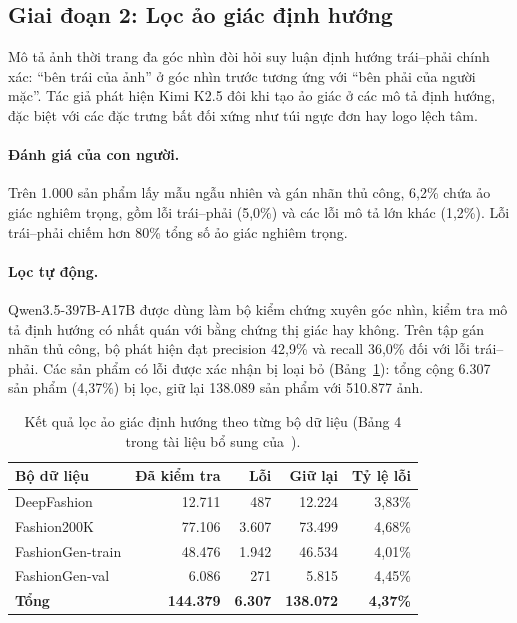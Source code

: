 \subsection{Giai đoạn 2: Lọc ảo giác định hướng}

Mô tả ảnh thời trang đa góc nhìn đòi hỏi suy luận định hướng trái--phải chính xác: ``bên trái của ảnh'' ở góc nhìn trước tương ứng với ``bên phải của người mặc''. Tác giả phát hiện Kimi K2.5 đôi khi tạo ảo giác ở các mô tả định hướng, đặc biệt với các đặc trưng bất đối xứng như túi ngực đơn hay logo lệch tâm.

\paragraph{Đánh giá của con người.} Trên 1.000 sản phẩm lấy mẫu ngẫu nhiên và gán nhãn thủ công, 6,2\% chứa ảo giác nghiêm trọng, gồm lỗi trái--phải (5,0\%) và các lỗi mô tả lớn khác (1,2\%). Lỗi trái--phải chiếm hơn 80\% tổng số ảo giác nghiêm trọng.

\paragraph{Lọc tự động.} Qwen3.5-397B-A17B được dùng làm bộ kiểm chứng xuyên góc nhìn, kiểm tra mô tả định hướng có nhất quán với bằng chứng thị giác hay không. Trên tập gán nhãn thủ công, bộ phát hiện đạt precision 42,9\% và recall 36,0\% đối với lỗi trái--phải. Các sản phẩm có lỗi được xác nhận bị loại bỏ (Bảng~\ref{tab:hallucination}): tổng cộng 6.307 sản phẩm (4,37\%) bị lọc, giữ lại 138.089 sản phẩm với 510.877 ảnh.

\begin{table}[h]
\centering
\caption{Kết quả lọc ảo giác định hướng theo từng bộ dữ liệu (Bảng 4 trong tài liệu bổ sung của~\cite{yuan2026fashionmv}).}
\label{tab:hallucination}
\begin{tabular}{lrrrr}
\toprule
Bộ dữ liệu & Đã kiểm tra & Lỗi & Giữ lại & Tỷ lệ lỗi \\
\midrule
DeepFashion      & 12.711 & 487   & 12.224 & 3,83\% \\
Fashion200K      & 77.106 & 3.607 & 73.499 & 4,68\% \\
FashionGen-train & 48.476 & 1.942 & 46.534 & 4,01\% \\
FashionGen-val   & 6.086  & 271   & 5.815  & 4,45\% \\
\midrule
\textbf{Tổng}    & \textbf{144.379} & \textbf{6.307} & \textbf{138.072} & \textbf{4,37\%} \\
\bottomrule
\end{tabular}
\end{table}

